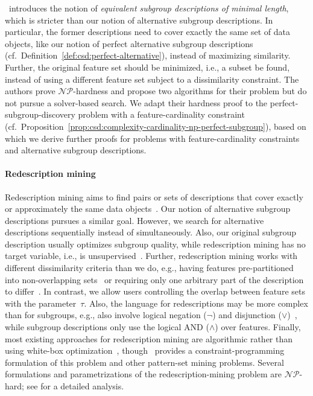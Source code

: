 \documentclass{article}
\theoremstyle{definition}
\begin{document}
\cite{boley2009non}~introduces the notion of \emph{equivalent subgroup descriptions of minimal length}, which is stricter than our notion of alternative subgroup descriptions.
In particular, the former descriptions need to cover exactly the same set of data objects, like our notion of perfect alternative subgroup descriptions (cf.~Definition~\ref{def:csd:perfect-alternative}), instead of maximizing similarity.
Further, the original feature set should be minimized, i.e., a subset be found, instead of using a different feature set subject to a dissimilarity constraint.
The authors prove $\mathcal{NP}$-hardness and propose two algorithms for their problem but do not pursue a solver-based search.
We adapt their hardness proof to the perfect-subgroup-discovery problem with a feature-cardinality constraint (cf.~Proposition~\ref{prop:csd:complexity-cardinality-np-perfect-subgroup}), based on which we derive further proofs for problems with feature-cardinality constraints and alternative subgroup descriptions.

\paragraph{Redescription mining}

Redescription mining aims to find pairs or sets of descriptions that cover exactly or approximately the same data objects~\cite{galbrun2017redescription, ramakrishnan2004turning}.
Our notion of alternative subgroup descriptions pursues a similar goal.
However, we search for alternative descriptions sequentially instead of simultaneously.
Also, our original subgroup description usually optimizes subgroup quality, while redescription mining has no target variable, i.e., is unsupervised~\cite{ramakrishnan2004turning}.
Further, redescription mining works with different dissimilarity criteria than we do, e.g., having features pre-partitioned into non-overlapping sets~\cite{galbrun2017redescription, gallo2008finding, mihelcic2023complexity} or requiring only one arbitrary part of the description to differ~\cite{parida2005redescription}.
In contrast, we allow users controlling the overlap between feature sets with the parameter~$\tau$.
Also, the language for redescriptions may be more complex than for subgroups, e.g., also involve logical negation ($\lnot$) and disjunction ($\lor$)~\cite{galbrun2017redescription, gallo2008finding}, while subgroup descriptions only use the logical AND ($\land$) over features.
Finally, most existing approaches for redescription mining are algorithmic rather than using white-box optimization~\cite{galbrun2017redescription, mihelcic2023complexity}, though~\cite{guns2013kpattern} provides a constraint-programming formulation of this problem and other pattern-set mining problems.
Several formulations and parametrizations of the redescription-mining problem are $\mathcal{NP}$-hard; see \cite{mihelcic2023complexity} for a detailed analysis.
\end{document}
